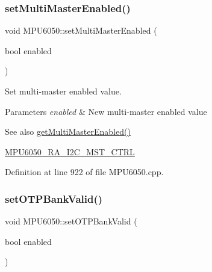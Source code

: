 \subsubsection{\texorpdfstring{setMultiMasterEnabled()}{setMultiMasterEnabled()}}
{\footnotesize\ttfamily void M\+P\+U6050\+::set\+Multi\+Master\+Enabled (\begin{DoxyParamCaption}\item[{bool}]{enabled }\end{DoxyParamCaption})}

Set multi-\/master enabled value. 
\begin{DoxyParams}{Parameters}
{\em enabled} & New multi-\/master enabled value \\
\hline
\end{DoxyParams}
\begin{DoxySeeAlso}{See also}
\mbox{\hyperlink{classMPU6050_aa88483068837bd9bc9c9f6c59a7a79b7}{get\+Multi\+Master\+Enabled()}} 

\mbox{\hyperlink{MPU6050_8h_ae4804708dd5f21dbca1ff1815b883504}{M\+P\+U6050\+\_\+\+R\+A\+\_\+\+I2\+C\+\_\+\+M\+S\+T\+\_\+\+C\+T\+RL}} 
\end{DoxySeeAlso}


Definition at line 922 of file M\+P\+U6050.\+cpp.


\begin{DoxyCode}{0}

\end{DoxyCode}
\mbox{\label{classMPU6050_a074024a7818b2998b3f1c99064bea3a0}} 
\subsubsection{\texorpdfstring{setOTPBankValid()}{setOTPBankValid()}}
{\footnotesize\ttfamily void M\+P\+U6050\+::set\+O\+T\+P\+Bank\+Valid (\begin{DoxyParamCaption}\item[{bool}]{enabled }\end{DoxyParamCaption})}



